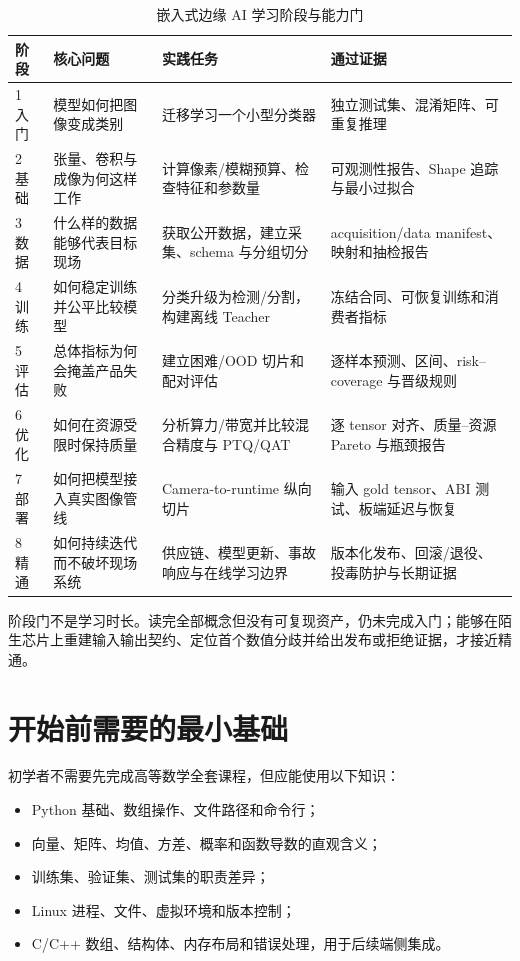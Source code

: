 \begin{table}[H]
  \centering
  \caption{嵌入式边缘 AI 学习阶段与能力门}
  \begin{tabular}{p{17mm}p{31mm}p{43mm}p{43mm}}
    \hline
    阶段 & 核心问题 & 实践任务 & 通过证据 \\
    \hline
    1 入门 & 模型如何把图像变成类别 & 迁移学习一个小型分类器 & 独立测试集、混淆矩阵、可重复推理 \\
    2 基础 & 张量、卷积与成像为何这样工作 & 计算像素/模糊预算、检查特征和参数量 & 可观测性报告、Shape 追踪与最小过拟合 \\
    3 数据 & 什么样的数据能够代表目标现场 & 获取公开数据，建立采集、schema 与分组切分 & acquisition/data manifest、映射和抽检报告 \\
    4 训练 & 如何稳定训练并公平比较模型 & 分类升级为检测/分割，构建离线 Teacher & 冻结合同、可恢复训练和消费者指标 \\
    5 评估 & 总体指标为何会掩盖产品失败 & 建立困难/OOD 切片和配对评估 & 逐样本预测、区间、risk--coverage 与晋级规则 \\
    6 优化 & 如何在资源受限时保持质量 & 分析算力/带宽并比较混合精度与 PTQ/QAT & 逐 tensor 对齐、质量--资源 Pareto 与瓶颈报告 \\
    7 部署 & 如何把模型接入真实图像管线 & Camera-to-runtime 纵向切片 & 输入 gold tensor、ABI 测试、板端延迟与恢复 \\
    8 精通 & 如何持续迭代而不破坏现场系统 & 供应链、模型更新、事故响应与在线学习边界 & 版本化发布、回滚/退役、投毒防护与长期证据 \\
    \hline
  \end{tabular}
\end{table}

阶段门不是学习时长。读完全部概念但没有可复现资产，仍未完成入门；能够在陌生芯片上重建输入输出契约、定位首个数值分歧并给出发布或拒绝证据，才接近精通。

\section{开始前需要的最小基础}

初学者不需要先完成高等数学全套课程，但应能使用以下知识：

\begin{itemize}
  \item Python 基础、数组操作、文件路径和命令行；
  \item 向量、矩阵、均值、方差、概率和函数导数的直观含义；
  \item 训练集、验证集、测试集的职责差异；
  \item Linux 进程、文件、虚拟环境和版本控制；
  \item C/C++ 数组、结构体、内存布局和错误处理，用于后续端侧集成。
\end{itemize}

